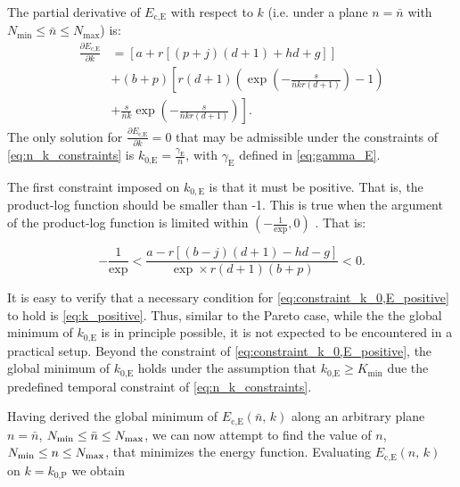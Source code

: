 \documentclass[twocolumn,english]{IEEEtran}
\theoremstyle{plain}
\theoremstyle{definition}
\begin{document}
The partial derivative of $E_{\text{c,E}}$ with respect to $k$ (i.e.
under a plane $n=\bar{n}$ with $N_{\min}\leq\bar{n}\leq N_{\max}$)
is: 
\begin{equation}
\begin{array}{cc}
\frac{\partial E_{\text{c,E}}}{\partial k} & =\left[a+r\left[\left(p+j\right)\left(d+1\right)+hd+g\right]\right]\\
 & +\left(b+p\right)\left[r\left(d+1\right)\left(\exp\left(-\frac{s}{\bar{n}kr(d+1)}\right)-1\right)\right.\\
 & \left.+\frac{s}{\bar{n}k}\exp\left(-\frac{s}{\bar{n}kr(d+1)}\right)\right].
\end{array}
\end{equation}
The only solution for $\frac{\partial E_{\text{c,E}}}{\partial k}=0$
that may be admissible under the constraints of \eqref{eq:n_k_constraints}
is $k_{\text{0,E}}=\frac{\gamma_{\textrm{E}}}{\bar{n}}$, with $\gamma_{\textrm{E}}$
defined in \eqref{eq:gamma_E}.

\noindent The first constraint imposed on $k_{0,\textrm{E}}$ is that
it must be positive. That is, the product-log function should be smaller
than -1. This is true when the argument of the product-log function
is limited within $\left(-\frac{1}{\exp},0\right)$ \cite{corless1996lambertw}.
That is:

\begin{equation}
-\frac{1}{\exp}<\frac{a-r\left[\left(b-j\right)\left(d+1\right)-hd-g\right]}{\exp\times r(d+1)(b+p)}<0.\label{eq:constraint_k_0,E_positive}
\end{equation}


It is easy to verify that a necessary condition for \eqref{eq:constraint_k_0,E_positive}
to hold is \eqref{eq:k_positive}. Thus, similar to the Pareto case,
while the the global minimum of $k_{\text{0,E}}$ is in principle
possible, it is not expected to be encountered in a practical setup.
Beyond the constraint of \eqref{eq:constraint_k_0,E_positive}, the
global minimum of $k_{\text{0,E}}$ holds under the assumption that
$k_{\text{0,E}}\geq K_{\min}$ due the predefined temporal constraint
of \eqref{eq:n_k_constraints}.

Having derived the global minimum of $E_{\text{c,E}}(\bar{n},\, k)$
along an arbitrary plane $n=\bar{n}$, $N_{\textnormal{min}}\le\bar{n}\le N_{\textnormal{max}}$,
we can now attempt to find the value of $n$, $N_{\textnormal{min}}\le n\le N_{\textnormal{max}}$,
that minimizes the energy function. Evaluating $E_{\text{c,E}}(n,\, k)$
on $k=k_{\text{0,P}}$ we obtain
\end{document}
